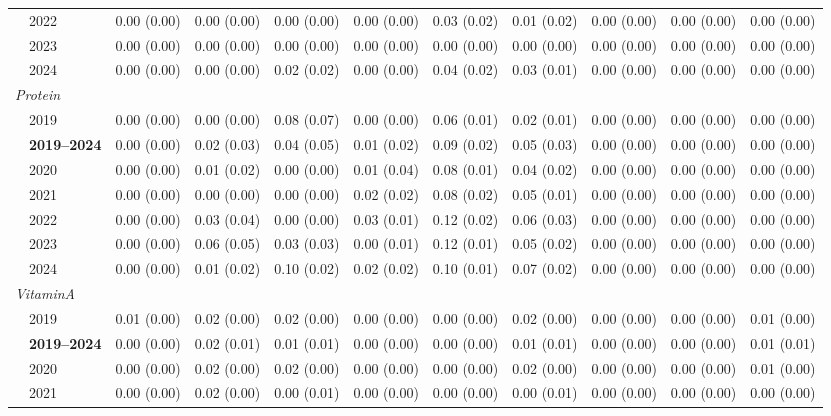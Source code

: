 \begin{table}[htbp]
\begin{tabular}{llrrrrrrrrr}
 & 2022 & 0.00 (0.00) & 0.00 (0.00) & 0.00 (0.00) & 0.00 (0.00) & 0.03 (0.02) & 0.01 (0.02) & 0.00 (0.00) & 0.00 (0.00) & 0.00 (0.00) \\
 & 2023 & 0.00 (0.00) & 0.00 (0.00) & 0.00 (0.00) & 0.00 (0.00) & 0.00 (0.00) & 0.00 (0.00) & 0.00 (0.00) & 0.00 (0.00) & 0.00 (0.00) \\
 & 2024 & 0.00 (0.00) & 0.00 (0.00) & 0.02 (0.02) & 0.00 (0.00) & 0.04 (0.02) & 0.03 (0.01) & 0.00 (0.00) & 0.00 (0.00) & 0.00 (0.00) \\
\midrule
\multicolumn{11}{l}{\textit{Protein}} \\
 & 2019 & 0.00 (0.00) & 0.00 (0.00) & 0.08 (0.07) & 0.00 (0.00) & 0.06 (0.01) & 0.02 (0.01) & 0.00 (0.00) & 0.00 (0.00) & 0.00 (0.00) \\
 & \textbf{2019–2024} & 0.00 (0.00) & 0.02 (0.03) & 0.04 (0.05) & 0.01 (0.02) & 0.09 (0.02) & 0.05 (0.03) & 0.00 (0.00) & 0.00 (0.00) & 0.00 (0.00) \\
 & 2020 & 0.00 (0.00) & 0.01 (0.02) & 0.00 (0.00) & 0.01 (0.04) & 0.08 (0.01) & 0.04 (0.02) & 0.00 (0.00) & 0.00 (0.00) & 0.00 (0.00) \\
 & 2021 & 0.00 (0.00) & 0.00 (0.00) & 0.00 (0.00) & 0.02 (0.02) & 0.08 (0.02) & 0.05 (0.01) & 0.00 (0.00) & 0.00 (0.00) & 0.00 (0.00) \\
 & 2022 & 0.00 (0.00) & 0.03 (0.04) & 0.00 (0.00) & 0.03 (0.01) & 0.12 (0.02) & 0.06 (0.03) & 0.00 (0.00) & 0.00 (0.00) & 0.00 (0.00) \\
 & 2023 & 0.00 (0.00) & 0.06 (0.05) & 0.03 (0.03) & 0.00 (0.01) & 0.12 (0.01) & 0.05 (0.02) & 0.00 (0.00) & 0.00 (0.00) & 0.00 (0.00) \\
 & 2024 & 0.00 (0.00) & 0.01 (0.02) & 0.10 (0.02) & 0.02 (0.02) & 0.10 (0.01) & 0.07 (0.02) & 0.00 (0.00) & 0.00 (0.00) & 0.00 (0.00) \\
\midrule
\multicolumn{11}{l}{\textit{VitaminA}} \\
 & 2019 & 0.01 (0.00) & 0.02 (0.00) & 0.02 (0.00) & 0.00 (0.00) & 0.00 (0.00) & 0.02 (0.00) & 0.00 (0.00) & 0.00 (0.00) & 0.01 (0.00) \\
 & \textbf{2019–2024} & 0.00 (0.00) & 0.02 (0.01) & 0.01 (0.01) & 0.00 (0.00) & 0.00 (0.00) & 0.01 (0.01) & 0.00 (0.00) & 0.00 (0.00) & 0.01 (0.01) \\
 & 2020 & 0.00 (0.00) & 0.02 (0.00) & 0.02 (0.00) & 0.00 (0.00) & 0.00 (0.00) & 0.02 (0.00) & 0.00 (0.00) & 0.00 (0.00) & 0.01 (0.00) \\
 & 2021 & 0.00 (0.00) & 0.02 (0.00) & 0.00 (0.01) & 0.00 (0.00) & 0.00 (0.00) & 0.00 (0.01) & 0.00 (0.00) & 0.00 (0.00) & 0.00 (0.00) \\

\end{tabular}
\end{table}
